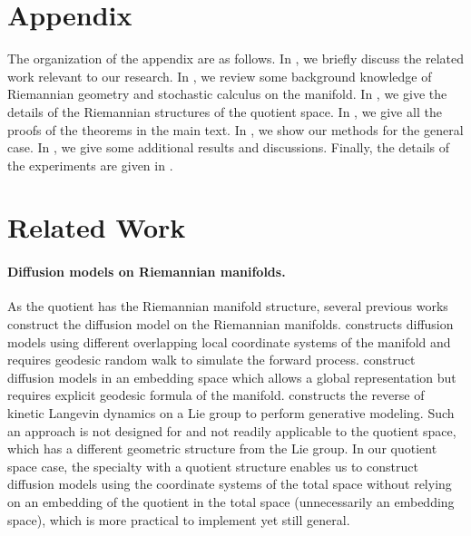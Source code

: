 \appendix
\section*{Appendix}
The organization of the appendix are as follows.
In , we briefly discuss the related work relevant to our research.
In , we review some background knowledge of Riemannian geometry and stochastic calculus on the manifold. In , we give the details of the Riemannian structures of the quotient space. In , we give all the proofs of the theorems in the main text. In , we show our methods for the general case. In , we give some additional results and discussions. Finally, the details of the experiments are given in .

\section{Related Work}
\label{appx:related}
\paragraph{Diffusion models on Riemannian manifolds.} As the quotient has the Riemannian manifold structure, several previous works construct the diffusion model on the Riemannian manifolds. \citet{de2022riemannian} constructs diffusion models using different overlapping local coordinate systems of the manifold and requires geodesic random walk to simulate the forward process. \citet{huang2022riemannian,chen2023flow} construct diffusion models in an embedding space which allows a global representation but requires explicit geodesic formula of the manifold. %
\citet{zhu2024trivialized} constructs the reverse of kinetic Langevin dynamics on a Lie group to perform generative modeling. %
Such an approach is not designed for and not readily applicable to the quotient space, which has a different geometric structure from the Lie group.
In our quotient space case, the specialty with a quotient structure enables us to construct diffusion models using the coordinate systems of the total space without relying on an embedding of the quotient in the total space (unnecessarily an embedding space), which is more practical to implement yet still general.

